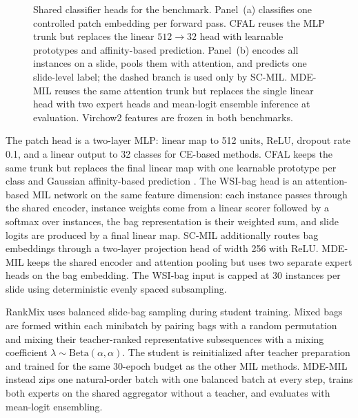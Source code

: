 \documentclass[11pt]{article}
\begin{document}
\begin{figure}[ht]
  \caption{Shared classifier heads for the benchmark. Panel~(a) classifies one controlled patch embedding per forward pass. CFAL reuses the MLP trunk but replaces the linear $512\to 32$ head with learnable prototypes and affinity-based prediction. Panel~(b) encodes all instances on a slide, pools them with attention, and predicts one slide-level label; the dashed branch is used only by SC-MIL. MDE-MIL reuses the same attention trunk but replaces the single linear head with two expert heads and mean-logit ensemble inference at evaluation. Virchow2 features are frozen in both benchmarks.}
  \label{fig:benchmark-models}
\end{figure}

\noindent The patch head is a two-layer MLP: linear map to 512 units, ReLU, dropout rate \num{0.1}, and a linear output to 32 classes for CE-based methods. CFAL keeps the same trunk but replaces the final linear map with one learnable prototype per class and Gaussian affinity-based prediction \citep{queisler2026imbalanceMethods}. The WSI-bag head is an attention-based MIL network on the same feature dimension: each instance passes through the shared encoder, instance weights come from a linear scorer followed by a softmax over instances, the bag representation is their weighted sum, and slide logits are produced by a final linear map. SC-MIL additionally routes bag embeddings through a two-layer projection head of width 256 with ReLU. MDE-MIL keeps the shared encoder and attention pooling but uses two separate expert heads on the bag embedding. The WSI-bag input is capped at 30 instances per slide using deterministic evenly spaced subsampling.

RankMix uses balanced slide-bag sampling during student training. Mixed bags are formed within each minibatch by pairing bags with a random permutation and mixing their teacher-ranked representative subsequences with a mixing coefficient $\lambda\sim\mathrm{Beta}(\alpha,\alpha)$. The student is reinitialized after teacher preparation and trained for the same 30-epoch budget as the other MIL methods. MDE-MIL instead zips one natural-order batch with one balanced batch at every step, trains both experts on the shared aggregator without a teacher, and evaluates with mean-logit ensembling.
\end{document}
